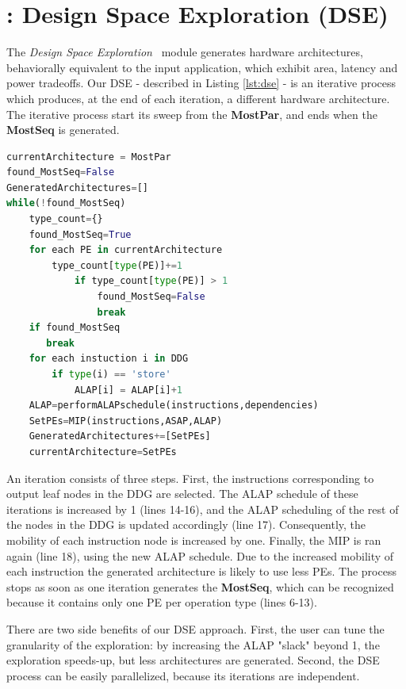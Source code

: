 \section{\frameworkname: Design Space Exploration (DSE)}
\label{ssec:dse}
The \textit{Design Space Exploration} \frameworkname~module generates hardware architectures, behaviorally equivalent to the input application, which exhibit area, latency and power tradeoffs.
Our DSE - described in Listing \ref{lst:dse} - is an iterative process which produces, at the end of each iteration, a different hardware architecture.
The iterative process start its sweep from the \textbf{MostPar}, and ends when the \textbf{MostSeq} is generated.
\begin{lstlisting}[language=Python, caption={\small Design Space Exploration},label={lst:dse},basicstyle=\tiny]
currentArchitecture = MostPar
found_MostSeq=False
GeneratedArchitectures=[]
while(!found_MostSeq)
    type_count={}
    found_MostSeq=True
    for each PE in currentArchitecture
        type_count[type(PE)]+=1
            if type_count[type(PE)] > 1
                found_MostSeq=False
                break
    if found_MostSeq
       break
    for each instuction i in DDG
        if type(i) == 'store'
            ALAP[i] = ALAP[i]+1
    ALAP=performALAPschedule(instructions,dependencies)
    SetPEs=MIP(instructions,ASAP,ALAP)
    GeneratedArchitectures+=[SetPEs]
    currentArchitecture=SetPEs
\end{lstlisting}
An iteration consists of three steps. First, the instructions corresponding to output leaf nodes in the DDG are selected. The ALAP schedule of these iterations is increased by 1 (lines 14-16), and the ALAP scheduling of the rest of the nodes in the DDG is updated accordingly (line 17). Consequently, the mobility of each instruction node is increased by one. Finally, the MIP is ran again (line 18), using the new ALAP schedule. Due to the increased mobility of each instruction the generated architecture is likely to use less PEs.
The process stops as soon as one iteration generates the \textbf{MostSeq}, which can be recognized because it contains only one PE per operation type (lines 6-13).

There are two side benefits of our DSE approach. First, the user can tune the granularity of the exploration: by increasing the ALAP "slack" beyond 1, the exploration speeds-up, but less architectures are generated. Second, the DSE process can be easily parallelized, because its iterations are independent.

